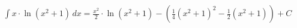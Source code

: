 \documentclass[preview]{standalone}
\begin{document}
\begin{align*}
\int x \cdot \ln(x^2 + 1) \, dx =  \frac{x^2}{2} \cdot \ln(x^2 + 1) - \left( \frac{1}{4} (x^2 + 1)^2 - \frac{1}{2} (x^2 + 1) \right) + C
\end{align*}
\end{document}
